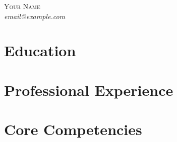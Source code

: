 \documentclass[10pt,a4paper]{article}
\begin{document}
\begin{center}
    {\Huge \textsc{Your Name}} \\
    \vspace{2mm}
    \textit{email@example.com}
\end{center}

\section*{Education}


\section*{Professional Experience}


\section*{Core Competencies}
\begin{itemize}
\end{itemize}
\end{document}
